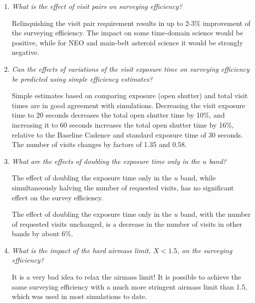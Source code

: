 \begin{enumerate}
\item {\it What is the effect of visit pairs on surveying efficiency? }

Relinquishing the visit pair requirement results in up to 2-3\%
improvement of the surveying efficiency. The impact on some
time-domain science would be positive, while for NEO and main-belt
asteroid science it would be strongly negative.


\item {\it Can the effects of variations of the visit exposure time on
surveying efficiency be predicted using simple efficiency estimates?}

Simple estimates based on comparing exposure (open shutter) and total
visit times are in good agreement with simulations. Decreasing the
visit exposure time to 20 seconds decreases the total open shutter
time by 10\%, and increasing it to 60 seconds increases the total open
shutter time by 16\%, relative to the Baseline Cadence and standard
exposure time of 30 seconds. The number of visits changes by factors
of 1.35 and 0.58.


\item {\it What are the effects of doubling the exposure time only in
the $u$ band?}

The effect of doubling the exposure time only in the $u$ band, while
simultaneously halving the number of requested visits, has no
significant effect on the survey efficiency.

The effect of doubling the exposure time only in the $u$ band, with
the number of requested visits unchanged, is a decrease in the number
of visits in other bands by about 6\%.


\item {\it What is the impact of the hard airmass limit, $X<1.5$, on the
surveying efficiency?}

It is a very bad idea to relax the airmass limit! It is possible to
achieve the same surveying efficiency with a much more stringent airmass
limit than 1.5, which was used in most simulations to date.

\end{enumerate}


\navigationbar

